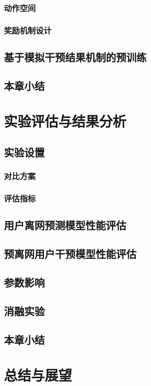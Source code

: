 \subsubsection{动作空间}
\subsubsection{奖励机制设计}
\subsection{基于模拟干预结果机制的预训练}
\subsection{本章小结}

\section{实验评估与结果分析}
\subsection{实验设置}
\subsubsection{对比方案}
\subsubsection{评估指标}
\subsection{用户离网预测模型性能评估}
\subsection{预离网用户干预模型性能评估}
\subsection{参数影响}
\subsection{消融实验}
\subsection{本章小结}

\section{总结与展望}
